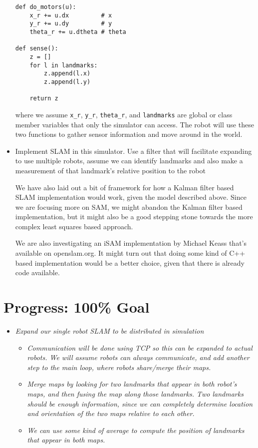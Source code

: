 \documentclass[11pt]{article}
\begin{document}
\begin{itemize}
\begin{verbatim}
def do_motors(u):
    x_r += u.dx         # x
    y_r += u.dy         # y
    theta_r += u.dtheta # theta

def sense():
    z = []
    for l in landmarks:
        z.append(l.x)
        z.append(l.y)
        
    return z
\end{verbatim}
where we assume \texttt{x\_r}, \texttt{y\_r}, \texttt{theta\_r}, and \texttt{landmarks} are global or class member variables that only the simulator can access. The robot will use these two functions to gather sensor information and move around in the world.
        
    \item Implement SLAM in this simulator. Use a filter that will facilitate expanding to use multiple robots, assume we can identify landmarks and also make a measurement of that landmark's relative position to the robot

We have also laid out a bit of framework for how a Kalman filter based SLAM implementation would work, given the model described above. Since we are focusing more on SAM, we might abandon the Kalman filter based implementation, but it might also be a good stepping stone towards the more complex least squares based approach. 

We are also investigating an iSAM implementation by Michael Keass \cite{isam1} that's available on openslam.org. It might turn out that doing some kind of C++ based implementation would be a better choice, given that there is already code available.

\end{itemize}
\section{Progress: 100\% Goal}

\begin{itemize}
    \item \emph{Expand our single robot SLAM to be distributed in simulation}
    \begin{itemize}
        \item \emph{Communication will be done using TCP so this can be expanded to actual robots. We will assume robots can always communicate, and add another step to the main loop, where robots share/merge their maps.}
        \item \emph{Merge maps by looking for two landmarks that appear in both robot's maps, and then fusing the map along those landmarks. Two landmarks should be enough information, since we can completely determine location and orientation of the two maps relative to each other.}
        \item \emph{We can use some kind of average to compute the position of landmarks that appear in both maps.}
    \end{itemize}
\end{itemize}
\end{document}
